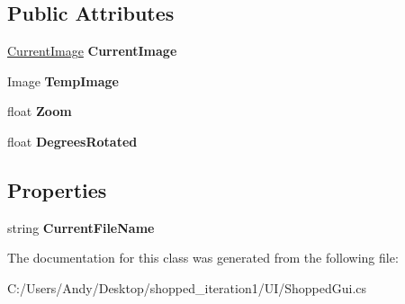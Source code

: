 \subsection*{Public Attributes}
\begin{DoxyCompactItemize}
\item 
\hypertarget{class_u_i_1_1_shopped_gui_a5af6be41b45d660fee1d3829e4efb076}{
\hyperlink{class_core_1_1_images_1_1_current_image}{CurrentImage} {\bfseries CurrentImage}}
\label{class_u_i_1_1_shopped_gui_a5af6be41b45d660fee1d3829e4efb076}

\item 
\hypertarget{class_u_i_1_1_shopped_gui_a62fc006c1db87e4d71e8f313ac14fcd4}{
Image {\bfseries TempImage}}
\label{class_u_i_1_1_shopped_gui_a62fc006c1db87e4d71e8f313ac14fcd4}

\item 
\hypertarget{class_u_i_1_1_shopped_gui_a113332eb4e26d02fb827a36f173905b2}{
float {\bfseries Zoom}}
\label{class_u_i_1_1_shopped_gui_a113332eb4e26d02fb827a36f173905b2}

\item 
\hypertarget{class_u_i_1_1_shopped_gui_ab1fe281087a87319a7949a098ba26fd2}{
float {\bfseries DegreesRotated}}
\label{class_u_i_1_1_shopped_gui_ab1fe281087a87319a7949a098ba26fd2}

\end{DoxyCompactItemize}
\subsection*{Properties}
\begin{DoxyCompactItemize}
\item 
\hypertarget{class_u_i_1_1_shopped_gui_aa56c5ee16f18d98e8d99b48aec602a9c}{
string {\bfseries CurrentFileName}}
\label{class_u_i_1_1_shopped_gui_aa56c5ee16f18d98e8d99b48aec602a9c}

\end{DoxyCompactItemize}


The documentation for this class was generated from the following file:\begin{DoxyCompactItemize}
\item 
C:/Users/Andy/Desktop/shopped\_\-iteration1/UI/ShoppedGui.cs\end{DoxyCompactItemize}
